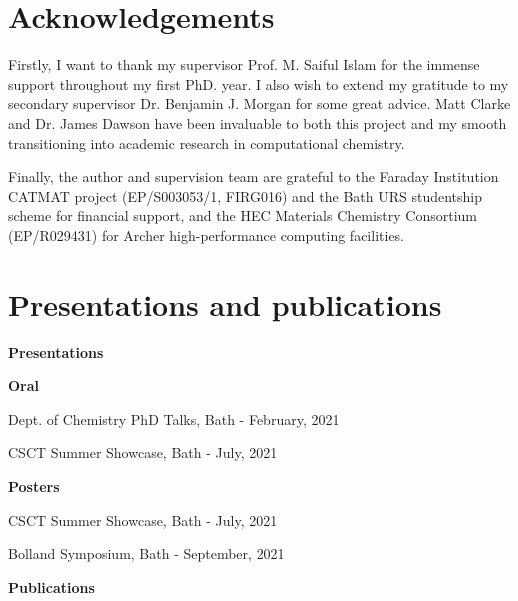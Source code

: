 \documentclass[12pt]{report}
\begin{document}
\clearpage





\chapter*{Acknowledgements}

Firstly, I want to thank my supervisor Prof. M. Saiful Islam for the immense support throughout my first PhD. year. 
I also wish to extend my gratitude to my secondary supervisor Dr. Benjamin J. Morgan for some great advice.
Matt Clarke and Dr. James Dawson have been invaluable to both this project and my smooth transitioning into academic research in computational chemistry.

Finally, the author and supervision team are grateful to the Faraday Institution CATMAT project (EP/S003053/1, FIRG016) and the Bath URS studentship scheme for financial support, and the HEC Materials Chemistry Consortium (EP/R029431) for Archer high-performance computing facilities.

\clearpage





\chapter*{Presentations and publications}

{\Large\textbf{Presentations}\par}

\vspace{0.3 cm}

{\large\textbf{Oral}\par}

Dept. of Chemistry PhD Talks, Bath - February, 2021

CSCT Summer Showcase, Bath - July, 2021

\vspace{0.3 cm}

{\large\textbf{Posters}\par}

CSCT Summer Showcase, Bath - July, 2021

Bolland Symposium, Bath - September, 2021

\vspace{1 cm}

\noindent
{\Large\textbf{Publications}\par}
\end{document}
